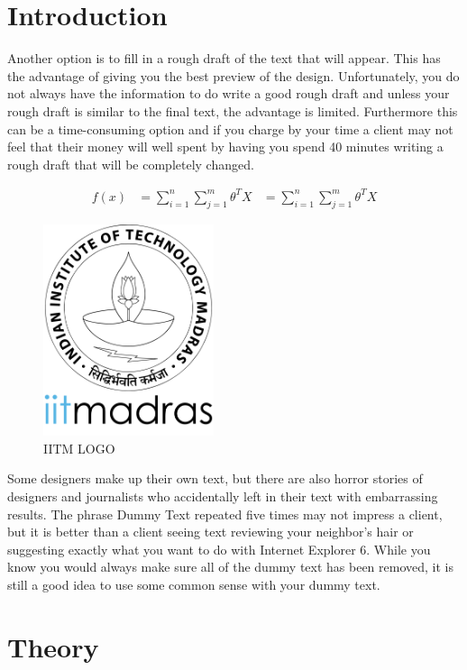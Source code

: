 \documentclass{article}
\begin{document}
\section{Introduction}
Another option is to fill in a rough draft of the text that will appear. This has the advantage of giving you the best preview of the design. Unfortunately, you do not always have the information to do write a good rough draft and unless your rough draft is similar to the final text, the advantage is limited. Furthermore this can be a time-consuming option and if you charge by your time a client may not feel that their money will well spent by having you spend 40 minutes writing a rough draft that will be completely changed.

\begin{equation}
	\begin{align*}
	f(x) &= \sum_{i=1}^{n} \sum_{j=1}^{m} \theta^TX 
	&=\sum_{i=1}^{n} \sum_{j=1}^{m} \theta^TX
	\end{align*}
\end{equation}
\begin{figure}[h]
	\centering
	\includegraphics[width=5cm]{logo.png}
	\caption{IITM LOGO}
\end{figure}

Some designers make up their own text, but there are also horror stories of designers and journalists who accidentally left in their text with embarrassing results. The phrase Dummy Text repeated five times may not impress a client, but it is better than a client seeing text reviewing your neighbor’s hair or suggesting exactly what you want to do with Internet Explorer 6. While you know you would always make sure all of the dummy text has been removed, it is still a good idea to use some common sense with your dummy text.
\section{Theory}
\end{document}
